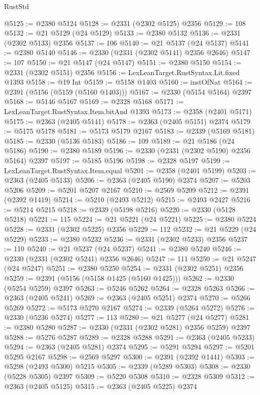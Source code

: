 \begin{lexlean}{RustStd}
\begin{coremodule}
@5125 := @2380 @5124
@5128 := @2331 (@2302 @5125) @2356
@5129 := 108
@5132 := @21 @5129 (@24 @5129)
@5133 := @2380 @5132
@5136 := @2331 (@2302 @5133) @2356
@5137 := 106
@5140 := @21 @5137 (@24 @5137)
@5141 := @2380 @5140
@5146 := @2330 (@2331 (@2302 @5141) @2356 @2646)
@5147 := 107
@5150 := @21 @5147 (@24 @5147)
@5151 := @2380 @5150
@5154 := @2331 (@2302 @5151) @2356
@5156 := LexLeanTarget.RustSyntax.Lit.fixed @1393
@5158 := @19 Int
@5159 := @5158 @1403
@5160 := instOfNat
@5164 := @2391 (@5156 (@5159 (@5160 @1403)))
@5167 := @2330 (@5154 @5164) @2397
@5168 := @5146 @5167
@5169 := @2328 @5168
@5171 := LexLeanTarget.RustSyntax.Item.bitAnd @1393
@5173 := @2358 (@2401 @5171)
@5175 := @2363 (@2405 @5141)
@5178 := @2363 (@2405 @5151) @2374
@5179 := @5175 @5178
@5181 := @5173 @5179 @2167
@5183 := @2339 (@5169 @5181)
@5185 := @2330 (@5136 @5183)
@5186 := 109
@5189 := @21 @5186 (@24 @5186)
@5190 := @2380 @5189
@5196 := @2330 (@2331 (@2302 @5190) @2356 @5164) @2397
@5197 := @5185 @5196
@5198 := @2328 @5197
@5199 := LexLeanTarget.RustSyntax.Item.equal
@5201 := @2358 (@2401 @5199)
@5203 := @2363 (@2405 @5133)
@5206 := @2363 (@2405 @5190) @2374
@5207 := @5203 @5206
@5209 := @5201 @5207 @2167
@5210 := @2569 @5209
@5212 := @2391 (@2392 @1419)
@5214 := @5210 (@2493 @5212)
@5215 := @2493 @2427
@5216 := @5214 @5215
@5218 := @2339 (@5198 @5216)
@5220 := @2330 (@5128 @5218)
@5221 := 115
@5224 := @21 @5221 (@24 @5221)
@5225 := @2380 @5224
@5228 := @2331 (@2302 @5225) @2356
@5229 := 112
@5232 := @21 @5229 (@24 @5229)
@5233 := @2380 @5232
@5236 := @2331 (@2302 @5233) @2356
@5237 := 110
@5240 := @21 @5237 (@24 @5237)
@5241 := @2380 @5240
@5246 := @2330 (@2331 (@2302 @5241) @2356 @2646)
@5247 := 111
@5250 := @21 @5247 (@24 @5247)
@5251 := @2380 @5250
@5254 := @2331 (@2302 @5251) @2356
@5259 := @2391 (@5156 (@5158 @1425 (@5160 @1425)))
@5262 := @2330 (@5254 @5259) @2397
@5263 := @5246 @5262
@5264 := @2328 @5263
@5266 := @2363 (@2405 @5241)
@5269 := @2363 (@2405 @5251) @2374
@5270 := @5266 @5269
@5272 := @5173 @5270 @2167
@5274 := @2339 (@5264 @5272)
@5276 := @2330 (@5236 @5274)
@5277 := 113
@5280 := @21 @5277 (@24 @5277)
@5281 := @2380 @5280
@5287 := @2330 (@2331 (@2302 @5281) @2356 @5259) @2397
@5288 := @5276 @5287
@5289 := @2328 @5288
@5291 := @2363 (@2405 @5233)
@5294 := @2363 (@2405 @5281) @2374
@5295 := @5291 @5294
@5297 := @5201 @5295 @2167
@5298 := @2569 @5297
@5300 := @2391 (@2392 @1441)
@5303 := @5298 (@2493 @5300) @5215
@5305 := @2339 (@5289 @5303)
@5308 := @2330 (@5228 @5305) @2397
@5309 := @5220 @5308
@5310 := @2328 @5309
@5312 := @2363 (@2405 @5125)
@5315 := @2363 (@2405 @5225) @2374

\end{coremodule}
\end{lexlean}
